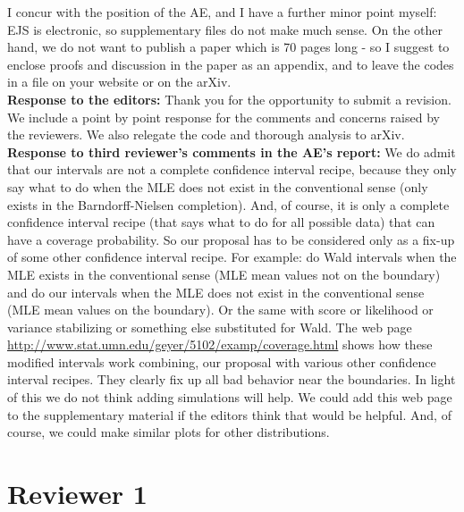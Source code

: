 \documentclass[12pt]{article}
\begin{document}
I concur with the position of the AE, and I have a further minor point myself: EJS is electronic, so supplementary files do not make much sense. On the other hand, we do not want to publish a paper which is 70 pages long - so I suggest to enclose proofs and discussion in the paper as an appendix, and to leave the codes in a file on your website or on the arXiv. \\

{\bf Response to the editors:} Thank you for the opportunity to submit a revision. We include a point by point response for the comments and concerns raised by the reviewers. We also relegate the code and thorough analysis to arXiv. \\

{\bf Response to third reviewer's comments in the AE's report:} %
We do admit that our intervals are not a complete confidence interval recipe, because they only say what to do when the MLE does not exist in the conventional sense (only exists in the Barndorff-Nielsen completion).  And, of course, it is only a complete confidence interval recipe (that says what to do for all possible data) that can have a coverage probability.  So our proposal has to be considered only as a fix-up of some other confidence interval recipe.  For example: do Wald intervals when the MLE exists in the conventional sense (MLE mean values not on the boundary) and do our intervals when the MLE does not exist in the conventional sense (MLE mean values on the boundary). Or the same with score or likelihood or variance stabilizing or something else substituted for Wald. The web page \url{http://www.stat.umn.edu/geyer/5102/examp/coverage.html} shows how these modified intervals work combining, our proposal with various other confidence interval recipes.  They clearly fix up all bad behavior near the boundaries.  In light of this we do not think adding simulations will help.  We could add this web page to the supplementary material if the editors think that would be helpful. And, of course, we could make similar plots for other distributions.




\newpage
\section*{Reviewer 1}
\end{document}
